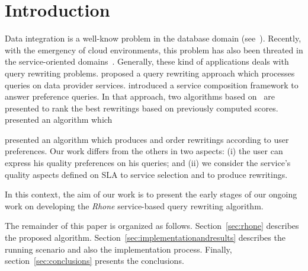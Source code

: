 \section{Introduction}
Data integration is a well-know problem in the database domain (see~\cite{Halevy:2001}). 
Recently, with the emergency of cloud environments, this problem has also been threated in the service-oriented domains~\cite{Barhamgi2010,Benouaret2011,ba2014}.
Generally, these kind of applications deals with query rewriting problems.
\cite{Barhamgi2010} proposed a query rewriting approach which processes queries on data provider services. \cite{Benouaret2011} introduced a service composition framework to answer preference queries. In that approach, two algorithms based on~\cite{Barhamgi2010} are presented to rank the best rewritings based on previously computed scores.
\cite{ba2014} presented an algorithm which 

\cite{ba2014} presented an algorithm which produces and order rewritings according to user preferences.
Our work differs from the others in two aspects: (i) the user can express his
quality preferences on his queries; and (ii) we consider the service's quality
aspects defined on SLA to service selection and to produce rewritings.    

In this context, the aim of our work is to present the early stages of our
ongoing work on developing the \textit{Rhone} service-based query rewriting
algorithm.

The remainder of this paper is organized as follows. Section~\ref{sec:rhone}
describes the proposed algorithm. Section~\ref{sec:implementationandresults} describes
the running scenario and also the implementation process.
Finally, section~\ref{sec:conclusions} presents the conclusions.
